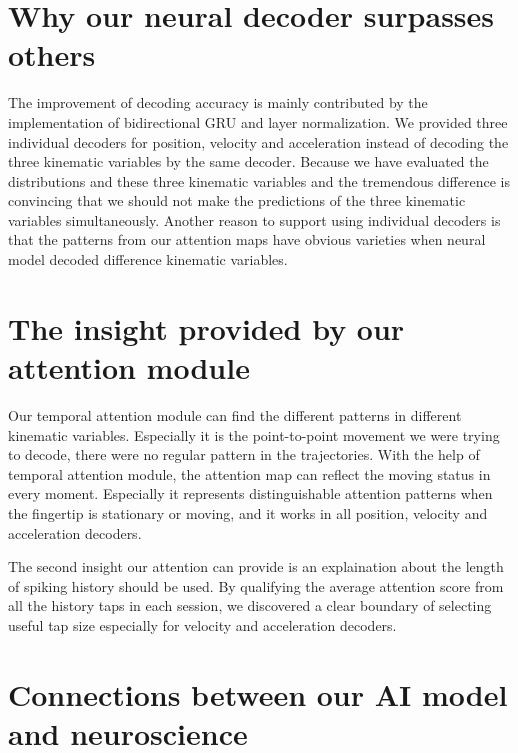\section{Why our neural decoder surpasses others}
The improvement of decoding accuracy is mainly contributed by the implementation of bidirectional GRU and layer normalization.
We provided three individual decoders for position,
velocity and acceleration instead of decoding the three kinematic variables by the same decoder.
Because we have evaluated the distributions and these three kinematic variables and the tremendous difference is convincing that we should not make the predictions of the three kinematic variables simultaneously.
Another reason to support using individual decoders is that the patterns from our attention maps have obvious varieties when neural model decoded difference kinematic variables.


\section{The insight provided by our attention module}
Our temporal attention module can find the different patterns in different kinematic variables.
Especially it is the point-to-point movement we were trying to decode, 
there were no regular pattern in the trajectories.
With the help of temporal attention module,
the attention map can reflect the moving status in every moment.
Especially it represents distinguishable attention patterns when the fingertip is stationary or moving,
and it works in all position, velocity and acceleration decoders.

The second insight our attention can provide is an explaination about the length of spiking history should be used.
By qualifying the average attention score from all the history taps in each session,
we discovered a clear boundary of selecting useful tap size especially for velocity and acceleration decoders.


\section{Connections between our AI model and neuroscience}
\label{sec:connections_between_our_AI_model_and_neuroscience}

